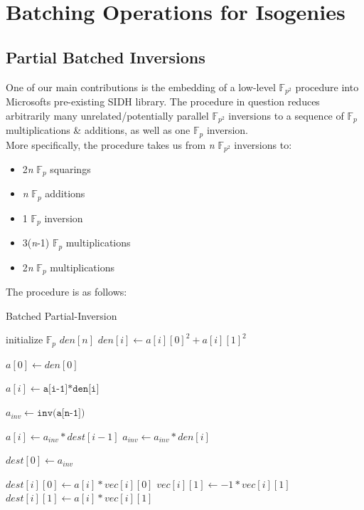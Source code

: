 \chapter{Batching Operations for Isogenies}

\section{Partial Batched Inversions}

One of our main contributions is the embedding of a low-level $\mathbb{F}_{p^{2}}$ procedure into Microsofts pre-existing SIDH library. The procedure in question reduces arbitrarily many unrelated/potentially parallel $\mathbb{F}_{p^{2}}$ inversions to a sequence of $\mathbb{F}_{p}$ multiplications \& additions, as well as one $\mathbb{F}_{p}$ inversion.\\

More specifically, the procedure takes us from \textit{n} $\mathbb{F}_{p^{2}}$  inversions to: 
\begin{center}
\begin{itemize}
\item 2\textit{n} $\mathbb{F}_{p}$ squarings
\item \textit{n} $\mathbb{F}_{p}$ additions
\item 1 $\mathbb{F}_{p}$ inversion
\item 3(\textit{n}-1) $\mathbb{F}_{p}$ multiplications
\item 2\textit{n} $\mathbb{F}_{p}$ multiplications
\end{itemize}
\end{center}


The procedure is as follows:\\

\begin{algorithm}
\caption{Batched Partial-Inversion}\label{euclid}
\begin{algorithmic}[1]
\State initialize $\mathbb{F}_{p}$ $den[n]$
	\State $den[i] \gets a[i][0]^{2} + a[i][1]^{2}$
\EndFor

\State $a[0] \gets den[0]$

	\State $a[i] \gets \texttt{a[i-1]*den[i]}$
\EndFor

\State $a_{inv} \gets \texttt{inv(a[n-1])}$

	\State $a[i] \gets a_{inv}*dest[i-1]$
	\State $a_{inv} \gets a_{inv}*den[i]$
\EndFor

\State $dest[0] \gets a_{inv}$

	\State $dest[i][0] \gets a[i]*vec[i][0]$
	\State $vec[i][1] \gets -1*vec[i][1]$
	\State $dest[i][1] \gets a[i]*vec[i][1]$
\EndFor
\EndProcedure
\end{algorithmic}
\end{algorithm}

